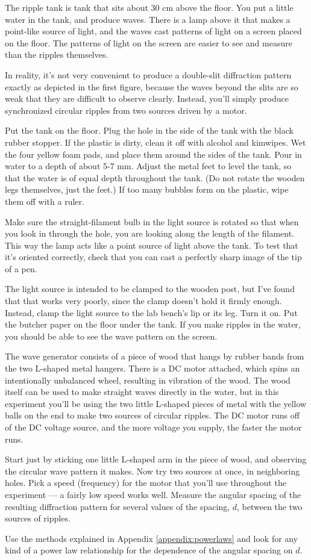 
The ripple tank is tank that sits about 30 cm above the
floor. You put a little water in the tank, and produce
waves. There is a lamp above it that makes a point-like
source of light, and the waves cast patterns of light on a
screen placed on the floor. The patterns of light on the
screen are easier to see and measure than the ripples themselves.

In reality, it's not very convenient to produce a double-slit
diffraction pattern exactly as depicted in the first figure,
because the waves beyond the slits are so weak that they are
difficult to observe clearly. Instead, you'll simply produce
synchronized circular ripples from two sources driven by a motor.

Put the tank on the floor. Plug the hole in the side of the
tank with the black rubber stopper. If the plastic is dirty, clean
it off with alcohol and kimwipes. Wet the four yellow
foam pads, and place them around the sides of the tank. Pour in water to
a depth of about 5-7 mm. Adjust the metal feet to level the
tank, so that the water is of equal depth throughout the
tank. (Do not rotate the wooden legs themselves, just the feet.)
If too many bubbles form on the plastic, wipe them off with a ruler.

Make sure the straight-filament bulb in the light source is
rotated so that when you look in through the hole, you are
looking along the length of the filament. This way the lamp
acts like a point source of light above the tank. To test that
it's oriented correctly, check that you can cast a perfectly
sharp image of the tip of a pen.

The light source is intended to be clamped to the wooden post, but
I've found that that works very poorly, since the clamp doesn't
hold it firmly enough. Instead, clamp the light source to the
lab bench's lip or its leg.
Turn it on. Put the butcher paper
on the floor under the tank. If you make
ripples in the water, you should be able to see the wave
pattern on the screen.

The wave generator consists of a piece of wood that hangs by
rubber bands from the two L-shaped metal hangers. There is a
DC motor attached, which spins an intentionally unbalanced
wheel, resulting in vibration of the wood. The wood itself
can be used to make straight waves directly in the water,
but in this experiment you'll be using the two little
L-shaped pieces of metal with the yellow balls on the end to
make two sources of circular ripples. The DC motor runs off
of the DC voltage source, and the more voltage you supply,
the faster the motor runs.

Start just by sticking one little L-shaped arm in the piece
of wood, and observing the circular wave pattern it makes.
Now try two sources at once, in neighboring holes. Pick a
speed (frequency) for the motor that you'll use throughout
the experiment --- a fairly low speed works well. Measure
the angular spacing of the resulting diffraction pattern for
several values of the spacing, $d$, between the two sources of ripples.

Use  the methods explained in Appendix \ref{appendix:powerlaws}
and look for any kind of a power law relationship
for the dependence of the angular spacing on $d$.
